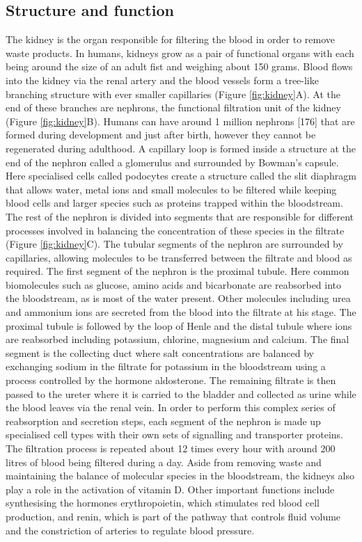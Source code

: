 \documentclass[11pt,a4paper,titlepage,twoside,openright]{style/unimelbthesis}
\theoremstyle{definition}
\theoremstyle{definition}
\theoremstyle{definition}
\theoremstyle{remark}
\begin{document}
\begin{mainmatter}
\hypertarget{structure-and-function}{%
\subsection{Structure and function}\label{structure-and-function}}

The kidney is the organ responsible for filtering the blood in order to remove waste products. In humans, kidneys grow as a pair of functional organs with each being around the size of an adult fist and weighing about 150 grams. Blood flows into the kidney via the renal artery and the blood vessels form a tree-like branching structure with ever smaller capillaries (Figure \ref{fig:kidney}A). At the end of these branches are nephrons, the functional filtration unit of the kidney (Figure \ref{fig:kidney}B). Humans can have around 1 million nephrons {[}176{]} that are formed during development and just after birth, however they cannot be regenerated during adulthood. A capillary loop is formed inside a structure at the end of the nephron called a glomerulus and surrounded by Bowman's capsule. Here specialised cells called podocytes create a structure called the slit diaphragm that allows water, metal ions and small molecules to be filtered while keeping blood cells and larger species such as proteins trapped within the bloodstream. The rest of the nephron is divided into segments that are responsible for different processes involved in balancing the concentration of these species in the filtrate (Figure \ref{fig:kidney}C). The tubular segments of the nephron are surrounded by capillaries, allowing molecules to be transferred between the filtrate and blood as required. The first segment of the nephron is the proximal tubule. Here common biomolecules such as glucose, amino acids and bicarbonate are reabsorbed into the bloodstream, as is most of the water present. Other molecules including urea and ammonium ions are secreted from the blood into the filtrate at his stage. The proximal tubule is followed by the loop of Henle and the distal tubule where ions are reabsorbed including potassium, chlorine, magnesium and calcium. The final segment is the collecting duct where salt concentrations are balanced by exchanging sodium in the filtrate for potassium in the bloodstream using a process controlled by the hormone aldosterone. The remaining filtrate is then passed to the ureter where it is carried to the bladder and collected as urine while the blood leaves via the renal vein. In order to perform this complex series of reabsorption and secretion steps, each segment of the nephron is made up specialised cell types with their own sets of signalling and transporter proteins. The filtration process is repeated about 12 times every hour with around 200 litres of blood being filtered during a day. Aside from removing waste and maintaining the balance of molecular species in the bloodstream, the kidneys also play a role in the activation of vitamin D. Other important functions include synthesising the hormones erythropoietin, which stimulates red blood cell production, and renin, which is part of the pathway that controls fluid volume and the constriction of arteries to regulate blood pressure.


\end{mainmatter}
\end{document}
